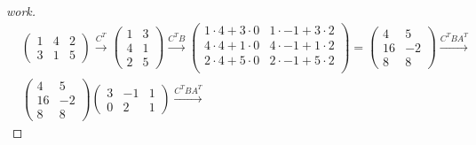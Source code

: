 \documentclass{article}
\begin{document}
\begin{enumerate}
  \begin{proof}[work]
    \begin{align*}
       & \begin{pmatrix}
           1 & 4 & 2 \\
           3 & 1 & 5
         \end{pmatrix} \xrightarrow{C^T}
      \begin{pmatrix}
        1 & 3 \\
        4 & 1 \\
        2 & 5
      \end{pmatrix}  \xrightarrow{C^TB}
      \begin{pmatrix}
        1 \cdot 4 + 3 \cdot 0 & 1 \cdot -1 + 3 \cdot 2 \\
        4 \cdot 4 + 1 \cdot 0 & 4 \cdot -1 + 1 \cdot 2 \\
        2 \cdot 4 + 5 \cdot 0 & 2 \cdot -1 + 5 \cdot 2 \\
      \end{pmatrix} =
      \begin{pmatrix}
        4  & 5  \\
        16 & -2 \\
        8  & 8
      \end{pmatrix} \xrightarrow{C^TBA^T} \\
       & \begin{pmatrix}
           4  & 5  \\
           16 & -2 \\
           8  & 8
         \end{pmatrix}
      \begin{pmatrix}
        3 & -1 & 1 \\
        0 & 2  & 1
      \end{pmatrix}  \xrightarrow{C^TBA^T}

\end{align*}
\end{proof}
\end{enumerate}
\end{document}
